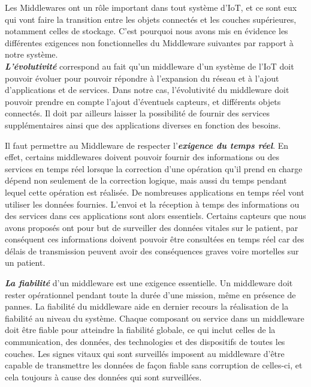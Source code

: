 Les Middlewares ont un rôle important dans tout système d’IoT, et ce sont eux qui vont faire la transition entre les objets connectés et les couches supérieures, notamment celles de stockage. C’est pourquoi nous avons mis en évidence les différentes exigences non fonctionnelles du Middleware suivantes par rapport à notre système.
\\

\textbf{\textit{L'évolutivité}} correspond au fait  qu'un middleware d’un système de l’IoT doit pouvoir évoluer pour pouvoir répondre à l’expansion du réseau et à l’ajout d’applications et de services. Dans notre cas, l’évolutivité du middleware doit pouvoir prendre en compte l’ajout d’éventuels capteurs, et différents objets connectés. Il doit par ailleurs laisser la possibilité de fournir des services supplémentaires ainsi que des applications diverses en fonction des besoins.

Il faut permettre au Middleware de respecter l'\textbf{\textit{exigence du temps réel}}. En effet, certains middlewares doivent pouvoir fournir des informations ou des services en temps réel lorsque la correction d'une opération qu’il prend en charge dépend non seulement de la correction logique, mais aussi du temps pendant lequel cette opération est réalisée. De nombreuses applications en temps réel vont utiliser les données fournies. L’envoi et la réception à temps des informations ou des services dans ces applications sont alors essentiels. Certains capteurs que nous avons proposés ont pour but de surveiller des données vitales sur le patient, par conséquent ces informations doivent pouvoir être consultées en temps réel car des délais de transmission peuvent avoir des conséquences graves voire mortelles sur un patient.

\textbf{\textit{La fiabilité}} d'un middleware est une exigence essentielle. Un middleware doit rester opérationnel pendant toute la durée d'une mission, même en présence de pannes. La fiabilité du middleware aide en dernier recours la réalisation de la fiabilité au niveau du système. Chaque composant ou service dans un middleware doit être fiable pour atteindre la fiabilité globale, ce qui inclut celles de la communication, des données, des technologies et des dispositifs de toutes les couches. Les signes vitaux qui sont surveillés imposent au middleware d’être capable de transmettre les données de façon fiable sans corruption de celles-ci, et cela toujours à cause des données qui sont surveillées.

